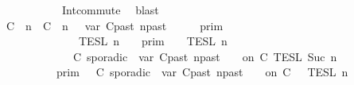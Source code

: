\begin{isabellebody}
\ \ \ \ \ \ \ \ \ \ \ \ Int{\isacharunderscore}commute\ \isamarkupfalse%
\ blast\isanewline
\ \ \ \ \isamarkupfalse%
\ \isamarkupfalse%
\ {\isacartoucheopen}{\isasymlbrakk}{\isasymlbrakk}\ {\isacharparenleft}C\ {\isasymUp}\ n{\isacharparenright}\ {\isacharhash}\ {\isacharparenleft}C\ {\isasymDown}\ n\ {\isacharat}{\isasymsharp}\ {\isasymlparr}\ {\isasymtau}\isactrlsub v\isactrlsub a\isactrlsub r\ {\isacharparenleft}C\isactrlsub p\isactrlsub a\isactrlsub s\isactrlsub t{\isacharcomma}\ n\isactrlsub p\isactrlsub a\isactrlsub s\isactrlsub t{\isacharparenright}\ {\isasymoplus}\ {\isasymdelta}{\isasymtau}\ {\isasymrparr}{\isacharparenright}\ {\isacharhash}\ {\isasymGamma}\ {\isasymrbrakk}{\isasymrbrakk}\isactrlsub p\isactrlsub r\isactrlsub i\isactrlsub m\isanewline
\ \ \ \ \ \ \ \ \ \ \ \ {\isasyminter}\ {\isasymlbrakk}{\isasymlbrakk}\ {\isasymPsi}\ {\isasymrbrakk}{\isasymrbrakk}\isactrlsub T\isactrlsub E\isactrlsub S\isactrlsub L\isactrlbsup {\isasymge}\ n\isactrlesup \ {\isasymunion}\ {\isasymlbrakk}{\isasymlbrakk}\ {\isasymGamma}\ {\isasymrbrakk}{\isasymrbrakk}\isactrlsub p\isactrlsub r\isactrlsub i\isactrlsub m\ {\isasyminter}\ {\isasymlbrakk}{\isasymlbrakk}\ {\isasymPsi}\ {\isasymrbrakk}{\isasymrbrakk}\isactrlsub T\isactrlsub E\isactrlsub S\isactrlsub L\isactrlbsup {\isasymge}\ n\isactrlesup \isanewline
\ \ \ \ \ \ \ \ \ \ \ \ {\isasyminter}\ {\isasymlbrakk}\ C\ sporadic{\isasymsharp}\ {\isasymlparr}\ {\isasymtau}\isactrlsub v\isactrlsub a\isactrlsub r\ {\isacharparenleft}C\isactrlsub p\isactrlsub a\isactrlsub s\isactrlsub t{\isacharcomma}\ n\isactrlsub p\isactrlsub a\isactrlsub s\isactrlsub t{\isacharparenright}\ {\isasymoplus}\ {\isasymdelta}{\isasymtau}\ {\isasymrparr}\ on\ C\ {\isasymrbrakk}\isactrlsub T\isactrlsub E\isactrlsub S\isactrlsub L\isactrlbsup {\isasymge}\ Suc\ n\isactrlesup \isanewline
\ \ \ \ \ \ \ \ {\isacharequal}\ {\isasymlbrakk}{\isasymlbrakk}\ {\isasymGamma}\ {\isasymrbrakk}{\isasymrbrakk}\isactrlsub p\isactrlsub r\isactrlsub i\isactrlsub m\ {\isasyminter}\ {\isasymlbrakk}{\isasymlbrakk}\ {\isacharparenleft}C\ sporadic{\isasymsharp}\ {\isasymlparr}\ {\isasymtau}\isactrlsub v\isactrlsub a\isactrlsub r\ {\isacharparenleft}C\isactrlsub p\isactrlsub a\isactrlsub s\isactrlsub t{\isacharcomma}\ n\isactrlsub p\isactrlsub a\isactrlsub s\isactrlsub t{\isacharparenright}\ {\isasymoplus}\ {\isasymdelta}{\isasymtau}\ {\isasymrparr}\ on\ C\ {\isacharhash}\ {\isasymPsi}\ {\isasymrbrakk}{\isasymrbrakk}\isactrlsub T\isactrlsub E\isactrlsub S\isactrlsub L\isactrlbsup {\isasymge}\ n\isactrlesup {\isacartoucheclose}\isanewline

\end{isabellebody}

